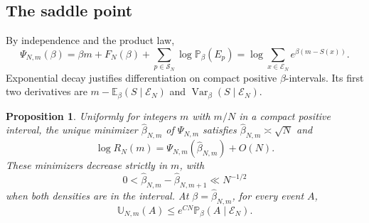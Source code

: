 \documentclass[11pt]{amsart}
\newtheorem{proposition}[theorem]{Proposition}
\theoremstyle{remark}
\DeclareMathOperator{\Var}{Var}
\newcommand{\Pp}{\mathbb P}
\newcommand{\Ee}{\mathbb E}
\begin{document}
\subsection{The saddle point}

By independence and the product law,
\begin{equation}\label{eq:psi-saddle}
 \Psi_{N,m}(\beta)=\beta m+F_N(\beta)+\sum_{p\in\mathcal S_N}
   \log\Pp_\beta(E_p)
 =\log\sum_{x\in\mathcal E_N}e^{\beta(m-S(x))}.
\end{equation}
Exponential decay justifies differentiation on compact positive
\(\beta\)-intervals. Its first two derivatives are
\(m-\Ee_\beta(S\mid\mathcal E_N)\) and \(\Var_\beta(S\mid\mathcal E_N)\).

\begin{proposition}\label{prop:saddle}
Uniformly for integers \(m\) with \(m/N\) in a compact positive interval,
the unique minimizer \(\widehat\beta_{N,m}\) of \(\Psi_{N,m}\) satisfies
\(\widehat\beta_{N,m}\asymp\sqrt N\) and
\begin{equation}\label{eq:sharp-saddle}
 \log R_N(m)=\Psi_{N,m}(\widehat\beta_{N,m})+O(N).
\end{equation}
These minimizers decrease strictly in \(m\), with
\begin{equation}\label{eq:saddle-difference}
 0<\widehat\beta_{N,m}-\widehat\beta_{N,m+1}\ll N^{-1/2}
\end{equation}
when both densities are in the interval. At \(\beta=\widehat\beta_{N,m}\),
for every event \(A\),
\begin{equation}\label{eq:transfer}
 \mathbb U_{N,m}(A)\le e^{CN}\Pp_\beta(A\mid\mathcal E_N).
\end{equation}
\end{proposition}
\end{document}
